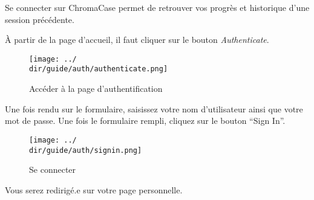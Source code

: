 Se connecter sur ChromaCase permet de retrouver vos progrès et historique d’une session précédente.

À partir de la page d’accueil, il faut cliquer sur le bouton \textit{Authenticate}.

\begin{figure}[H]
	\texttt{[image: ../\\dir/guide/auth/authenticate.png]}
	\caption{Accéder à la page d'authentification}
\end{figure}

Une fois rendu sur le formulaire, saisissez votre nom d’utilisateur ainsi que votre mot de passe.
Une fois le formulaire rempli, cliquez sur le bouton “Sign In”.

\begin{figure}[H]
	\begin{center}
		\texttt{[image: ../\\dir/guide/auth/signin.png]}
		\caption{Se connecter}
	\end{center}
\end{figure}

Vous serez redirigé.e sur votre page personnelle.
